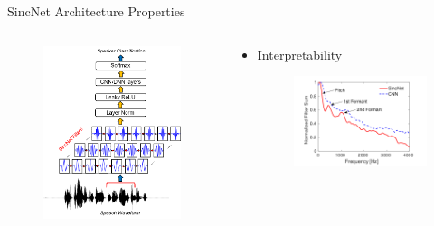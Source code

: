 \documentclass[notheorems, aspectratio=54]{beamer}
\begin{document}
\begin{frame}{SincNet Architecture Properties}
	\begin{columns}
		\begin{column}{0.47\textwidth}
			\begin{figure}[H]
				\includegraphics[width=0.9\linewidth]{images/SincNet.png}
			\end{figure}
		\end{column}
		\begin{column}{0.5\textwidth}
			\begin{itemize}
				\item Interpretability
				\begin{figure}[H]
					\includegraphics[width=0.9\linewidth]{images/interpretability.png}
				\end{figure}
			\end{itemize}
		\end{column}
	\end{columns}
\end{frame}
\end{document}
